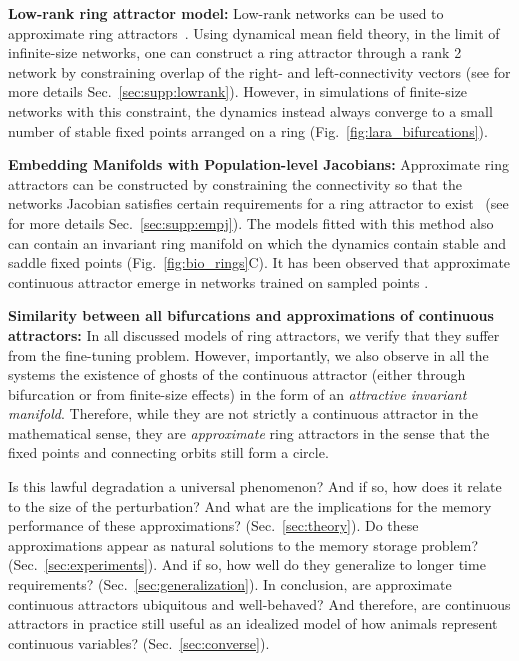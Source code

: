 \documentclass{article} %
\newcommand{\ptitle}[1]{\textbf{#1:}\xspace}
\newcounter{ct}
\theoremstyle{definition}
\theoremstyle{remark}
\begin{document}
\ptitle{Low-rank ring attractor model} %
Low-rank networks can be used to approximate ring attractors~\citep{mastrogiuseppe2018, beiran2021}.
Using dynamical mean field theory, in the limit of infinite-size networks, one can construct a ring attractor through a rank 2 network by constraining overlap of the right- and left-connectivity vectors (see for more details  Sec.~\ref{sec:supp:lowrank}).
However, in simulations of finite-size networks with this constraint, the dynamics instead always converge to a small number of stable fixed points arranged on a ring (Fig.~\ref{fig:lara_bifurcations}).

\ptitle{Embedding Manifolds with Population-level Jacobians} %
Approximate ring attractors can be constructed by constraining the connectivity so that the networks Jacobian satisfies certain requirements for a ring attractor to exist~\citep{pollock2020} (see for more details Sec.~\ref{sec:supp:empj}).
The models fitted with this method also can contain an invariant ring manifold on which the dynamics contain stable and saddle fixed points (Fig.~\ref{fig:bio_rings}C).
It has been observed that  approximate continuous attractor emerge in networks trained on sampled points \citep{darshan2022}.

\ptitle{Similarity between all bifurcations and approximations of continuous attractors}
In all discussed models of ring attractors, we verify that they suffer from the fine-tuning problem.
However, importantly, we also observe in all the systems  the existence of ghosts of the continuous attractor (either through bifurcation or from finite-size effects) in the form of an \emph{attractive invariant manifold}.
Therefore, while they are not strictly a continuous attractor in the mathematical sense, they are \textit{approximate} ring attractors in the sense that the fixed points and connecting orbits still form a circle.

Is this lawful degradation a universal phenomenon?
 And if so, how does it relate to the size of the perturbation? And what are the implications for the memory performance of these approximations? (Sec.~\ref{sec:theory}).
Do these approximations appear as natural solutions to the memory storage problem? (Sec.~\ref{sec:experiments}).
 And if so, how well do they generalize to longer time requirements? (Sec.~\ref{sec:generalization}).
In conclusion, are approximate continuous attractors ubiquitous and well-behaved?
 And therefore, are continuous attractors in practice still useful as an idealized model of how animals represent continuous variables? (Sec.~\ref{sec:converse}).
\end{document}
